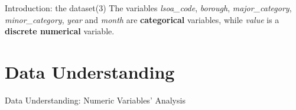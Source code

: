\documentclass[12pt]{beamer}
\begin{document}
        \begin{frame}{Introduction: the dataset(3)}
            The variables \textit{lsoa\_code}, \textit{borough}, \textit{major\_category},
            \textit{minor\_category}, \textit{year} and \textit{month} are \textbf{categorical} variables,
            while \textit{value} is a \textbf{discrete numerical} variable.
        \end{frame}

    \section{Data Understanding} %
    \label{sec:data_understanding}
        \begin{frame}{Data Understanding: Numeric Variables' Analysis}

        \end{frame}
\end{document}
